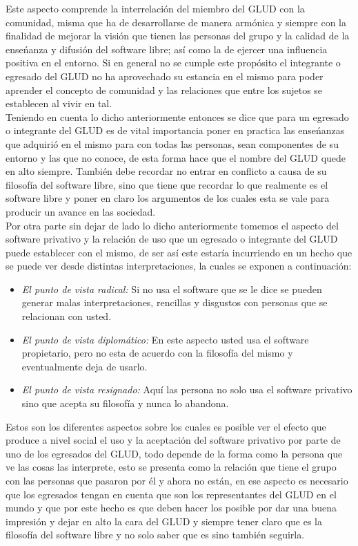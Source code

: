 \begin{multicols}{2}
Este aspecto comprende la interrelación del miembro del GLUD con la comunidad, misma que ha de desarrollarse de manera armónica y 
siempre con la finalidad de mejorar la visión que tienen las personas del grupo y la calidad de la enseńanza y difusión del software 
libre; así como la de ejercer una influencia positiva en el entorno. Si en general no se cumple este propósito el integrante o 
egresado del GLUD no ha aprovechado su estancia en el mismo para poder aprender el concepto de comunidad y las relaciones que 
entre los sujetos se establecen al vivir en tal.\\
Teniendo en cuenta lo dicho anteriormente entonces se dice que para un egresado o integrante del GLUD es de vital importancia 
poner en practica las enseńanzas que adquirió en el mismo para con todas las personas, sean componentes de su entorno y las que 
no conoce, de esta forma hace que el nombre del GLUD quede en alto siempre. También debe recordar no entrar en conflicto a causa 
de su filosofía del software libre, sino que tiene que recordar lo que realmente es el software libre y poner en claro los argumentos 
de los cuales esta se vale para producir un avance en las sociedad.\\
Por otra parte sin dejar de lado lo dicho anteriormente tomemos el aspecto del software privativo y la relación de uso que un egresado o
integrante del GLUD puede establecer con el mismo, de ser así este estaría incurriendo en un hecho que se puede ver desde distintas 
interpretaciones, la cuales se exponen a continuación:\\
\begin{itemize}
 \item \textit{El punto de vista radical:} Si no usa el software que se le dice se pueden generar malas interpretaciones,  rencillas 
 y disgustos con personas que se relacionan con usted. 
 \item \textit{El punto de vista diplomático:} En este aspecto usted usa el software propietario, pero no esta de acuerdo con la 
 filosofía del mismo y eventualmente deja de usarlo. 
 \item \textit{El punto de vista resignado:} Aquí las persona no solo usa el software privativo sino que acepta su filosofía y nunca lo abandona.
\end{itemize}

Estos son los diferentes aspectos sobre los cuales es posible ver el efecto que produce a nivel social el uso y la aceptación del 
software privativo por parte de uno de los egresados del GLUD, todo depende de la forma como la persona que ve las cosas las interprete,
esto se presenta como la relación que tiene el grupo con las personas que pasaron por él y ahora no están, en ese aspecto es necesario
que los egresados tengan en cuenta que son los representantes del GLUD en el mundo y que por este hecho es que deben hacer los posible por 
dar una buena impresión y dejar en alto la cara del GLUD y siempre tener claro que es la filosofía del software libre y no solo saber que es 
sino también seguirla.



\end{multicols}
